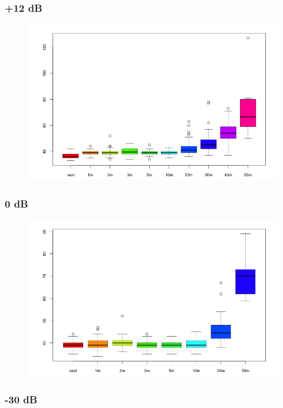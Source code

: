 \subsubsection{+12 dB}

\begin{figure}[H]
  \centering
  \includegraphics[width=1.0\textwidth]{img/tests/lqi/db_12.png}
\end{figure}


\subsubsection{0 dB}

\begin{figure}[H]
  \centering
  \includegraphics[width=1.0\textwidth]{img/tests/lqi/db_00.png}
\end{figure}

\subsubsection{-30 dB}

